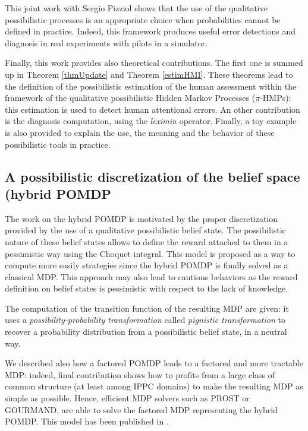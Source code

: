 This joint work with Sergio Pizziol 
shows that the use of the qualitative possibilistic processes
is an appropriate choice
when probabilities 
cannot be defined in practice.
Indeed, this framework produces
useful error detections and diagnosis
in real experiments 
with pilots in a simulator.

Finally, this work provides also 
theoretical contributions.
The first one is
summed up in Theorem \ref{thmUpdate} 
and Theorem \ref{estimHMI}.
These theorems lead to the definition
of the possibilistic estimation 
of the human assessment
within the framework of the qualitative possibilistic 
Hidden Markov Processes ($\pi$-HMPs):
this estimation is used to detect human attentional errors.
An other contribution 
is the diagnosis computation,
using the \textit{leximin} operator.
Finally, a toy example is also provided
to explain the use, the meaning and the behavior 
of these possibilistic tools in practice.

\subsection*{A possibilistic discretization of the belief space (hybrid POMDP}
The work on the hybrid POMDP is motivated 
by the proper discretization 
provided by the use 
of a qualitative possibilistic belief state.
The possibilistic nature of these belief states 
allows to define the reward attached to them 
in a pessimistic way using the Choquet integral.
This model is proposed as a way to compute
more easily strategies since the hybrid POMDP
is finally solved as a classical MDP.
This approach may also lead to cautious behaviors
as the reward definition on belief states is pessimistic
with respect to the lack of knowledge.

The computation of the transition function of the resulting MDP
are given: it uses a \textit{possibility-probability transformation}
called \textit{pignistic transformation} 
to recover a probability distribution 
from a possibilistic belief state, in a neutral way.

We described also how a factored POMDP 
leads to a factored and more tractable MDP:
indeed, final contribution shows how to profits from 
a large class of common structure (at least among IPPC domains)
to make the resulting MDP as simple as possible.
Hence, efficient MDP solvers such as PROST or GOURMAND, 
are able to solve the factored MDP 
representing the hybrid POMDP.
This model has been published in \cite{DBLP:conf/sum/DrougardDFT15}.

